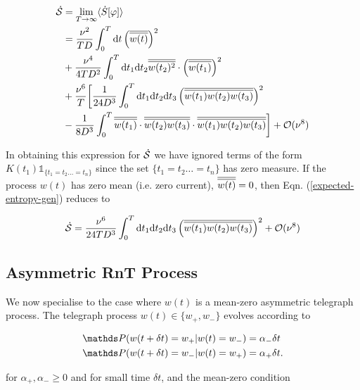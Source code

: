 \begin{align}\label{expected-entropy-gen}
\begin{split}
\dot{\mathcal{S}} &= \lim_{T\rightarrow \infty}\langle \dot{S}[\varphi] \rangle \\ 
&= \frac{\nu^2}{TD}\int_0^T\mathrm{d} t\left(\overline{\overline{w(t)}}\right)^2 \\
 &+ \frac{\nu^4}{4TD^2} \int_0^T \mathrm{d} t_1 \mathrm{d} t_2 \overline{\overline{w(t_2)^2}}\cdot\left(\overline{\overline{w(t_1)}}\right)^2\\ 
 &+ \frac{\nu^6}{T}\bigg[\frac{1}{24D^3}\int_0^T \mathrm{d} t_1 \mathrm{d} t_2 \mathrm{d} t_3 \left(\overline{\overline{w(t_1)w(t_2)w(t_3)}}\right)^2\\
  &- \frac{1}{8D^3}\int_0^T \overline{\overline{w(t_1)}}\cdot \overline{\overline{w(t_2)w(t_3)}}\cdot\overline{\overline{w(t_1)w(t_2)w(t_3)}}\bigg] + \mathcal{O}(\nu^8)
\end{split}
\end{align}

In obtaining this expression for $\dot{\mathcal{S}}$ we have ignored terms of the form $K(t_1)\mathds{1}_{\{t_1 = t_2 \ldots = t_n\}}$ since the set $\{t_1 = t_2 \ldots = t_n\}$ has zero measure. If the process $w(t)$ has zero mean (i.e. zero current), $\overline{\overline{w(t)}} = 0$, then Eqn. (\ref{expected-entropy-gen}) reduces to 

\begin{align}\label{zero-mean-entropy}
\dot{\mathcal{S}} = \frac{\nu^6}{24TD^3}\int_0^T \mathrm{d} t_1 \mathrm{d} t_2 \mathrm{d} t_3 \left(\overline{\overline{w(t_1)w(t_2)w(t_3)}}\right)^2 + \mathcal{O}(\nu^8)
\end{align}


\subsection{Asymmetric RnT Process}\label{subsection:asymmetric-RnT}

We now specialise to the case where $w(t)$ is a mean-zero asymmetric telegraph process. The telegraph process $w(t) \in \{w_+, w_-\}$ evolves according to 

\begin{align}
\begin{split}
\bP(w(t+\delta t) = w_+ | w(t) = w_-) &= \alpha_- \delta t \\ 
\bP(w(t+\delta t) = w_- | w(t) = w_+) &= \alpha_+ \delta t.
\end{split}
\end{align}

for $\alpha_+, \alpha_- \geq 0$ and for small time $\delta t$, and the mean-zero condition 

